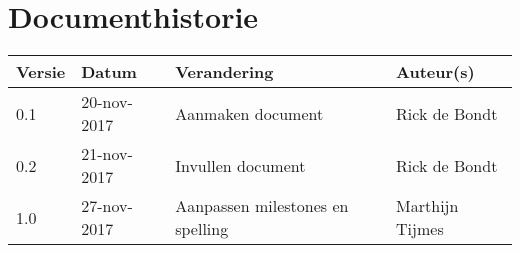 \section{Documenthistorie}

\begin{tabularx}{\textwidth}{| l | l | X | l |}
    \hline
    \textbf{Versie} & \textbf{Datum} & \textbf{Verandering} & \textbf{Auteur(s)} \\ \hline
    0.1 & 20-nov-2017 & Aanmaken document & Rick de Bondt \\ \hline
    0.2 & 21-nov-2017 & Invullen document & Rick de Bondt \\ \hline
    1.0 & 27-nov-2017 & Aanpassen milestones en spelling & Marthijn Tijmes \\ \hline
\end{tabularx}
